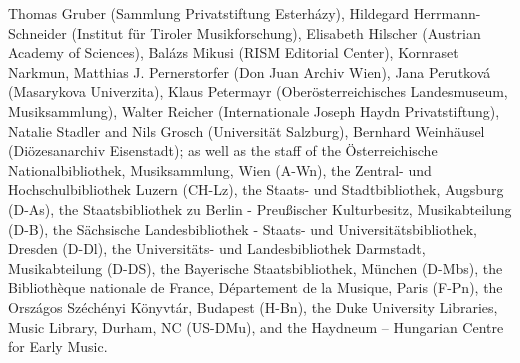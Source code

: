 \documentclass{ees}
\begin{document}
Thomas Gruber (Sammlung Privatstiftung Esterházy),
Hildegard Herrmann-Schneider (Institut für Tiroler Musikforschung),
Elisabeth Hilscher (Austrian Academy of Sciences),
Balázs Mikusi (RISM Editorial Center),
Kornraset Narkmun,
Matthias J. Pernerstorfer (Don Juan Archiv Wien),
Jana Perutková (Masarykova Univerzita),
Klaus Petermayr (Oberösterreichisches Landesmuseum, Musiksammlung),
Walter Reicher (Internationale Joseph Haydn Privatstiftung),
Natalie Stadler and Nils Grosch (Universität Salzburg),
Bernhard Weinhäusel (Diözesanarchiv Eisenstadt);
as well as the staff of
the Österreichische Nationalbibliothek, Musiksammlung, Wien (A-Wn),
the Zentral- und Hochschulbibliothek Luzern (CH-Lz),
the Staats- und Stadtbibliothek, Augsburg (D-As),
the Staatsbibliothek zu Berlin - Preußischer Kulturbesitz, Musikabteilung (D-B),
the Sächsische Landesbibliothek - Staats- und Universitätsbibliothek, Dresden (D-Dl),
the Universitäts- und Landesbibliothek Darmstadt, Musikabteilung (D-DS),
the Bayerische Staatsbibliothek, München (D-Mbs),
the Bibliothèque nationale de France, Département de la Musique, Paris (F-Pn),
the Országos Széchényi Könyvtár, Budapest (H-Bn),
the Duke University Libraries, Music Library, Durham, NC (US-DMu),
and the Haydneum – Hungarian Centre for Early Music.


\clearpage
{}
\end{document}

